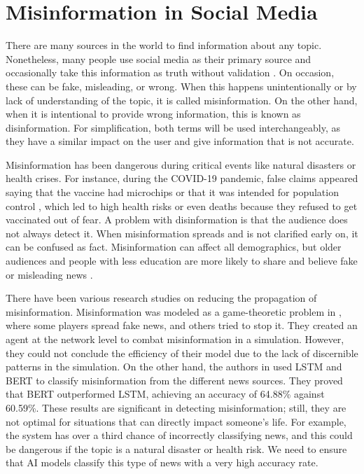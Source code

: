 \section{Misinformation in Social Media}
There are many sources in the world to find information about any topic. Nonetheless, many people use social media as their primary source \cite{socialmedias} and occasionally take this information as truth without
validation \cite{social_fact}. On occasion, these can be fake, misleading, or wrong. When this happens unintentionally or by lack of understanding of the topic, it is called misinformation. On the other hand,
when it is intentional to provide wrong information, this is known as disinformation. For simplification, both terms will be used interchangeably, as they have a similar impact on the user and give information that is not accurate.

Misinformation has been dangerous during critical events like natural disasters or health crises. For instance, during the COVID-19 pandemic, false claims appeared saying that the vaccine had
microchips or that it was intended for population control \cite{article_vaccine}, which led to high health risks or even deaths \cite{article} because they refused to get vaccinated out of fear. A problem with disinformation is that the audience
does not always detect it. When misinformation spreads and is not clarified early on, it can be confused as fact. Misinformation can affect all demographics, but older audiences and people with less education are more
likely to share and believe fake or misleading news  \cite{encyclopedia3040099}. 

There have been various research studies on reducing the propagation of misinformation. Misinformation was modeled as a game-theoretic problem in \cite{9906925}, where some players spread fake news, and others tried
to stop it. They created an agent at the network level to combat misinformation in a simulation. However, they could not conclude the efficiency of their model due to the lack of discernible patterns in the simulation. On
the other hand, the authors in \cite{10100054} used LSTM and BERT to classify misinformation from the different news sources. They proved that BERT outperformed LSTM, achieving an accuracy of 64.88\% against 60.59\%. 
These results are significant in detecting misinformation; still, they are not optimal for situations that can directly impact someone's life. For example, the system has over a third chance of incorrectly classifying news, and this could
be dangerous if the topic is a natural disaster or health risk. We need to ensure that AI models classify this type of news with a very high accuracy rate. 


